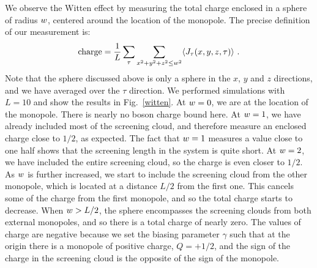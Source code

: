 We observe the Witten effect by measuring the total charge enclosed in a sphere of radius $\scripty{r}$, centered around the location of the monopole.  The precise definition of our measurement is:
\begin{equation}
{\rm charge}=\frac{1}{L}\sum_\tau \sum_{x^2+y^2+z^2\leq w^2} \langle J_\tau(x,y,z,\tau) \rangle ~.
\end{equation}
Note that the sphere discussed above is only a sphere in the $x$, $y$ and $z$ directions, and we have averaged over the $\tau$ direction.
We performed simulations with $L=10$ and show the results in Fig.~\ref{witten}.
At $\scripty{r}=0$, we are at the location of the monopole. There is nearly no boson charge bound here. At $\scripty{r}=1$, we have already included most of the screening cloud, and therefore measure an enclosed charge close to $1/2$, as expected. The fact that $\scripty{r}=1$ measures a value close to one half shows that the screening length in the system is quite short. At $\scripty{r}=2$, we have included the entire screening cloud, so the charge is even closer to $1/2$. As $\scripty{r}$ is further increased, we start to include the screening cloud from the other monopole, which is located at a distance $L/2$ from the first one. This cancels some of the charge from the first monopole, and so the total charge starts to decrease. When $\scripty{r}>L/2$, the sphere encompasses the screening clouds from both external monopoles, and so there is a total charge of nearly zero. The values of charge are negative because we set the biasing parameter $\gamma$ such that at the origin there is a monopole of positive charge, $Q=+1/2$, and the sign of the charge in the screening cloud is the opposite of the sign of the monopole. 

